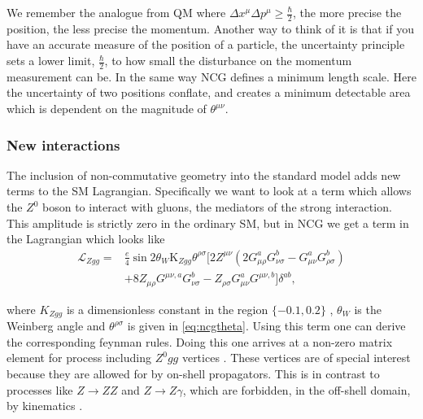We remember the analogue from QM where $\Delta x^{\mu} \Delta p^{\mu} \ge \frac{\hbar}{2}$, the more precise the position, the less precise the momentum. Another way to think of it is that if you have an accurate measure of the position of a particle, the uncertainty principle sets a lower limit, $\frac{\hbar}{2}$, to how small the disturbance on the momentum measurement can be. In the same way NCG defines a minimum length scale. Here the uncertainty of two positions conflate, and creates a minimum detectable area which is dependent on the magnitude of $\theta^{\mu \nu}$.

\subsubsection{New interactions}
The inclusion of non-commutative geometry into the standard model adds new terms to the SM Lagrangian. Specifically we want to look at a term which allows the $Z^0$ boson to interact with gluons, the mediators of the strong interaction. This amplitude is strictly zero in the ordinary SM, but in NCG we get a term in the Lagrangian which looks like \cite{melic2005smn}
\begin{align} \label{eq:zggterm}
	\mathcal{L}_{Zgg} = &\frac{e}{4}\sin{2\theta_W}\textrm{K}_{Zgg}\theta^{\rho\sigma}
	[2 Z^{\mu\nu} (2 G_{\mu\rho}^a G_{\nu\sigma}^b - G_{\mu\nu}^a G_{\rho\sigma}^b) \nonumber \\
	 &+ 8 Z_{\mu\rho} G^{\mu\nu,a} G_{\nu\sigma}^b - Z_{\rho\sigma} G_{\mu\nu}^a G^{\mu\nu,b}
	] \delta^{ab},
\end{align}

where $K_{Zgg}$ is a dimensionless constant in the region $\{-0.1,0.2\}$ \cite{behr2003dnc}, $\theta_W$ is the Weinberg angle and $\theta^{\rho\sigma}$ is given in \eqref{eq:ncgtheta}. Using this term one can derive the corresponding feynman rules. Doing this one arrives at a non-zero matrix element for process including $Z^0gg$ vertices \cite{melic2005smn}. These vertices are of special interest because they are allowed for by on-shell propagators. This is in contrast to processes like $Z \rightarrow ZZ$ and $Z \rightarrow Z\gamma$, which are forbidden, in the off-shell domain, by kinematics \cite{behr2003dnc}.
